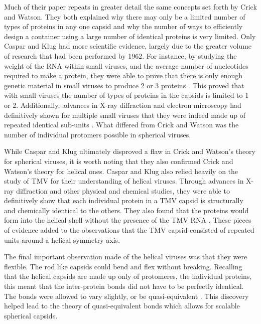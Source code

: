 \documentclass[12pt,letter]{article}
\begin{document}
Much of their paper repeats in greater detail the same concepts set forth by Crick and Watson. They both explained why there may only be a limited number of types of proteins in any one capsid and why the number of ways to efficiently design a container using a large number of identical proteins is very limited. Only Caspar and Klug had more scientific evidence, largely due to the greater volume of research that had been performed by 1962. For instance, by studying the weight of the RNA within small viruses, and the average number of nucleotides required to make a protein, they were able to prove that there is only enough genetic material in small viruses to produce 2 or 3 proteins \cite[p 1]{Caspar:1962}. This proved that with small viruses the number of types of proteins in the capsids is limited to 1 or 2. Additionally, advances in X-ray diffraction and electron microscopy had definitively shown for multiple small viruses that they were indeed made up of repeated  identical sub-units \cite[p 2]{Caspar:1962}. What differed from Crick and Watson was the number of individual protomers possible in spherical viruses.

While Caspar and Klug ultimately disproved a flaw in Crick and Watson's theory for spherical viruses, it is worth noting that they also confirmed Crick and Watson's theory for helical ones. Caspar and Klug also relied heavily on the study of TMV for their understanding of helical viruses. Through advances in X-ray diffraction and other physical and chemical studies, they were able to definitively show that each individual protein in a TMV capsid is structurally and chemically identical to the others. They also found that the proteins would form into the helical shell without the presence of the TMV RNA \cite[p 4-5]{Caspar:1962}. These pieces of evidence added to the observations that the TMV capsid consisted of repeated units around a helical symmetry axis.

The final important observation made of the helical viruses was that they were flexible. The rod like capsids could bend and flex without breaking. Recalling that the helical capsids are made up only of protomeres, the individual proteins, this meant that the inter-protein bonds did not have to be perfectly identical. The bonds were allowed to vary slightly, or be quasi-equivalent \cite[p 7]{Caspar:1962}. This discovery helped lead to the theory of quasi-equivalent bonds which allows for scalable spherical capsids.
\end{document}
